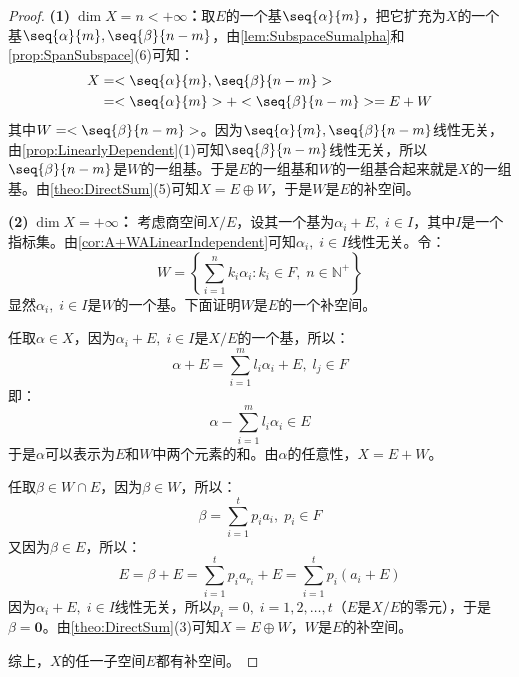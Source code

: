 \begin{proof}
	\textbf{(1)$\;\dim X=n<+\infty$：}取$E$的一个基$\seq{\alpha}{m}$，把它扩充为$X$的一个基$\seq{\alpha}{m},\seq{\beta}{n-m}$，由\cref{lem:SubspaceSumalpha}和\cref{prop:SpanSubspace}(6)可知：
	\begin{align*}
		X
		&=<\seq{\alpha}{m},\seq{\beta}{n-m}> \\
		&=<\seq{\alpha}{m}>+<\seq{\beta}{n-m}>=E+W
	\end{align*}
	其中$W=<\seq{\beta}{n-m}>$。因为$\seq{\alpha}{m},\seq{\beta}{n-m}$线性无关，由\cref{prop:LinearlyDependent}(1)可知$\seq{\beta}{n-m}$线性无关，所以$\seq{\beta}{n-m}$是$W$的一组基。于是$E$的一组基和$W$的一组基合起来就是$X$的一组基。由\cref{theo:DirectSum}(5)可知$X=E\oplus W$，于是$W$是$E$的补空间。\par
	\textbf{(2)$\;\dim X=+\infty$：}
	考虑商空间$X/E$，设其一个基为$\alpha_i+E,\;i\in I$，其中$I$是一个指标集。由\cref{cor:A+WALinearIndependent}可知$\alpha_i,\;i\in I$线性无关。令：
	\begin{equation*}
		W=\left\{\sum_{i=1}^{n}k_i\alpha_{i}:k_i\in F,\;n\in\mathbb{N}^+\right\}
	\end{equation*}
	显然$\alpha_i,\;i\in I$是$W$的一个基。下面证明$W$是$E$的一个补空间。\par
	任取$\alpha\in X$，因为$\alpha_i+E,\;i\in I$是$X/E$的一个基，所以：
	\begin{equation*}
		\alpha+E=\sum_{i=1}^{m}l_i\alpha_{i}+E,\;l_j\in F
	\end{equation*}
	即：
	\begin{equation*}
		\alpha-\sum_{i=1}^{m}l_i\alpha_{i}\in E
	\end{equation*}
	于是$\alpha$可以表示为$E$和$W$中两个元素的和。由$\alpha$的任意性，$X=E+W$。\par
	任取$\beta\in W\cap E$，因为$\beta\in W$，所以：
	\begin{equation*}
		\beta=\sum_{i=1}^{t}p_ia_{i},\;p_i\in F
	\end{equation*}
	又因为$\beta\in E$，所以：
	\begin{equation*}
		E=\beta+E=\sum_{i=1}^{t}p_ia_{r_i}+E=\sum_{i=1}^{t}p_i(a_{i}+E)
	\end{equation*}
	因为$\alpha_i+E,\;i\in I$线性无关，所以$p_i=0,\;i=1,2,\dots,t$（$E$是$X/E$的零元），于是$\beta=\mathbf{0}$。由\cref{theo:DirectSum}(3)可知$X=E\oplus W$，$W$是$E$的补空间。\par
	综上，$X$的任一子空间$E$都有补空间。
\end{proof}

